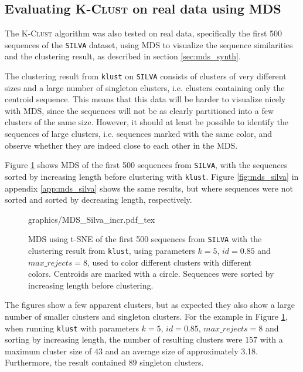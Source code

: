 \subsection{Evaluating \textsc{K-Clust} on real data using MDS}
\label{sec:mds_real_data}

The \textsc{K-Clust} algorithm was also tested on real data, specifically the
first 500 sequences of the \texttt{SILVA} dataset, using MDS to visualize the
sequence similarities and the clustering result, as described in section
\ref{sec:mds_synth}.


The clustering result from \texttt{klust} on \texttt{SILVA} consists of
clusters of very different sizes and a large number of singleton clusters, i.e.
clusters containing only the centroid sequence. This means that this data will
be harder to visualize nicely with MDS, since the sequences will not be as
clearly partitioned into a few clusters of the same size. However, it should at
least be possible to identify the sequences of large clusters, i.e. sequences
marked with the same color, and observe whether they are indeed close to each
other in the MDS.

Figure \ref{fig:mds_silva_sort_incr} shows MDS of the first 500 sequences from
\texttt{SILVA}, with the sequences sorted by increasing length before
clustering with \texttt{klust}. Figure \ref{fig:mds_silva} in appendix
\ref{app:mds_silva} shows the same results, but where sequences were not sorted
and sorted by decreasing length, respectively.

\begin{figure}[h!]
  \centering
  \def\svgwidth{\columnwidth}
  {graphics/MDS_Silva_incr.pdf_tex}
  \caption{MDS using t-SNE of the first 500 sequences from \texttt{SILVA} with
    the clustering result from \texttt{klust}, using parameters $k=5$,
    $id=0.85$ and $max\_rejects=8$, used to color different clusters with
    different colors. Centroids are marked with a circle. Sequences were sorted
    by increasing length before clustering.}
  \label{fig:mds_silva_sort_incr}
\end{figure}

The figures show a few apparent clusters, but as expected they also show a
large number of smaller clusters and singleton clusters. For the example in
Figure \ref{fig:mds_silva_sort_incr}, when running \texttt{klust} with
parameters $k=5$, $id=0.85$, $max\_rejects=8$ and sorting by increasing length,
the number of resulting clusters were $157$ with a maximum cluster size of $43$
and an average size of approximately \num{3.18}. Furthermore, the result
contained $89$ singleton clusters.

